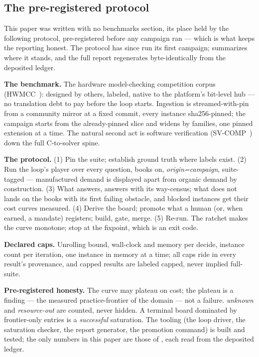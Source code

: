 \subsection{The pre-registered protocol}
\label{sec:kit-protocol}

This paper was written with no benchmarks section, its place held by
the following protocol, pre-registered before any campaign ran ---
which is what keeps the reporting honest. The protocol has since run
its first campaign;  summarizes where it stands,
and the full report regenerates byte-identically from the deposited
ledger.

\textbf{The benchmark.} The hardware model-checking competition
corpus (HWMCC~\citep{niemetz2018btor2}): designed by others, labeled,
native to the platform's bit-level hub — no translation debt to pay
before the loop starts. Ingestion is streamed-with-pin from a
community mirror at a fixed commit, every instance sha256-pinned; the
campaign starts from the already-pinned slice and widens by families,
one pinned extension at a time. The natural second act is software
verification (SV-COMP~\citep{beyer2021svcomp}) down the full
C-to-solver spine.

\textbf{The protocol.} (1) Pin the suite; establish ground truth
where labels exist. (2) Run the loop's player over every question,
books on, \textit{origin=campaign}, suite-tagged — manufactured
demand is displayed apart from organic demand by construction.
(3) What answers, answers with its way-census; what does not lands on
the books with its first failing obstacle, and blocked instances get
their cost curves measured. (4) Derive the board; promote what a
human (or, when earned, a mandate) registers; build, gate, merge.
(5) Re-run. The ratchet makes the curve monotone; stop at the
fixpoint, which is an exit code.

\textbf{Declared caps.} Unrolling bound, wall-clock and memory per
decide, instance count per iteration, one instance in memory at a
time; all caps ride in every result's provenance, and capped results
are labeled capped, never implied full-suite.

\textbf{Pre-registered honesty.} The curve may plateau on cost; the
plateau is a finding — the measured practice-frontier of the domain —
not a failure. \textit{unknown} and \textit{resource-out} are
counted, never hidden. A terminal board dominated by frontier-only
entries is a \emph{successful} saturation. The tooling (the loop
driver, the saturation checker, the report generator, the promotion
command) is built and tested; the only numbers in this paper are
those of , each read from the deposited ledger.
